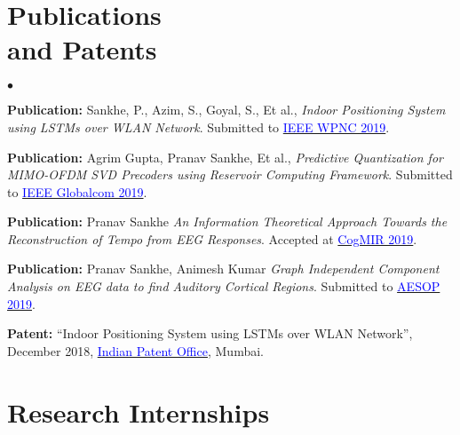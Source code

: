 \documentclass[margin,line, 9pt]{res}
\newenvironment{list2}{
  \begin{list}{$\bullet$}{%
      \setlength{\itemsep}{0.03in}
      \setlength{\parsep}{0in} \setlength{\parskip}{0in}
      \setlength{\topsep}{0in} \setlength{\partopsep}{0in} 
      \setlength{\leftmargin}{0.2in}}}{\end{list}}
\begin{document}
\begin{resume}
\section{\sc Publications \\ and Patents}
\begin{list2}
\item \textbf{Publication:} Sankhe, P., Azim, S., Goyal, S., Et al., {\em Indoor Positioning System using LSTMs over WLAN Network}. Submitted to \href{https://wpnc.info}{\textcolor{blue}{IEEE WPNC 2019}}.

\item \textbf{Publication:} Agrim Gupta, Pranav Sankhe, Et al., {\em Predictive Quantization for MIMO-OFDM SVD Precoders using Reservoir Computing Framework}. Submitted to \href{https://globecom2019.ieee-globecom.org}{\textcolor{blue} {IEEE Globalcom 2019}}.

\item \textbf{Publication:} Pranav Sankhe {\em An Information Theoretical Approach Towards the Reconstruction of Tempo from EEG Responses}. Accepted at \href{http://www.cogmir.org}{\textcolor{blue} {CogMIR 2019}}.

\item \textbf{Publication:} Pranav Sankhe, Animesh Kumar {\em Graph Independent Component Analysis on EEG data to find Auditory Cortical Regions}. Submitted to \href{https://gbiomed.kuleuven.be/english/research/50000666/50000672/Symposia/aesop/AESOP2019}{\textcolor{blue} {AESOP 2019}}.

\item \textbf{Patent:} “Indoor Positioning System using LSTMs over WLAN Network”, December 2018, \href{http://www.ipindia.nic.in}{\textcolor{blue} {Indian Patent Office}}, Mumbai.


\end{list2}

\section{\sc Research Internships}


\end{resume}
\end{document}
